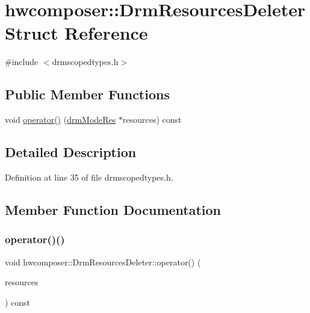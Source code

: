 \hypertarget{structhwcomposer_1_1DrmResourcesDeleter}{}\section{hwcomposer\+:\+:Drm\+Resources\+Deleter Struct Reference}
\label{structhwcomposer_1_1DrmResourcesDeleter}


{\ttfamily \#include $<$drmscopedtypes.\+h$>$}

\subsection*{Public Member Functions}
\begin{DoxyCompactItemize}
\item 
void \mbox{\hyperlink{structhwcomposer_1_1DrmResourcesDeleter_a1907aa858b4fdea7bf0b7578adc77647}{operator()}} (\mbox{\hyperlink{drmscopedtypes_8h_a394774c7e66da001652fbd93d026b853}{drm\+Mode\+Res}} $\ast$resources) const
\end{DoxyCompactItemize}


\subsection{Detailed Description}


Definition at line 35 of file drmscopedtypes.\+h.



\subsection{Member Function Documentation}
\mbox{\label{structhwcomposer_1_1DrmResourcesDeleter_a1907aa858b4fdea7bf0b7578adc77647}} 
\subsubsection{\texorpdfstring{operator()()}{operator()()}}
{\footnotesize\ttfamily void hwcomposer\+::\+Drm\+Resources\+Deleter\+::operator() (\begin{DoxyParamCaption}\item[{\mbox{\hyperlink{drmscopedtypes_8h_a394774c7e66da001652fbd93d026b853}{drm\+Mode\+Res}} $\ast$}]{resources }\end{DoxyParamCaption}) const}



